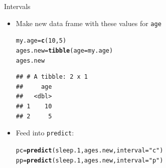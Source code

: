 \documentclass[unknownkeysallowed]{beamer}\usepackage[]{graphicx}\usepackage[]{color}
\makeatletter
\newcommand{\hlnum}[1]{\textcolor[rgb]{0.686,0.059,0.569}{#1}}%
\newcommand{\hlstr}[1]{\textcolor[rgb]{0.192,0.494,0.8}{#1}}%
\newcommand{\hlstd}[1]{\textcolor[rgb]{0.345,0.345,0.345}{#1}}%
\newcommand{\hlkwb}[1]{\textcolor[rgb]{0.69,0.353,0.396}{#1}}%
\newcommand{\hlkwc}[1]{\textcolor[rgb]{0.333,0.667,0.333}{#1}}%
\newcommand{\hlkwd}[1]{\textcolor[rgb]{0.737,0.353,0.396}{\textbf{#1}}}%
\newenvironment{kframe}{%
 \def\at@end@of@kframe{}%
 \ifinner\ifhmode%
  \def\at@end@of@kframe{\end{minipage}}%
  \begin{minipage}{\columnwidth}%
 \fi\fi%
 \def\FrameCommand##1{\hskip\@totalleftmargin \hskip-\fboxsep
 \colorbox{shadecolor}{##1}\hskip-\fboxsep
     \hskip-\linewidth \hskip-\@totalleftmargin \hskip\columnwidth}%
 \MakeFramed {\advance\hsize-\width
   \@totalleftmargin\z@ \linewidth\hsize
   \@setminipage}}%
 {\par\unskip\endMakeFramed%
 \at@end@of@kframe}
\newenvironment{knitrout}{}{} %
\makeatother
\begin{document}
\begin{frame}[fragile]{Intervals}
\begin{itemize}
\item Make new data frame with these values for \texttt{age}
  
\begin{knitrout}
\color{fgcolor}\begin{kframe}
\begin{alltt}
\hlstd{my.age}\hlkwb{=}\hlkwd{c}\hlstd{(}\hlnum{10}\hlstd{,}\hlnum{5}\hlstd{)}
\hlstd{ages.new}\hlkwb{=}\hlkwd{tibble}\hlstd{(}\hlkwc{age}\hlstd{=my.age)}
\hlstd{ages.new}
\end{alltt}
\begin{verbatim}
## # A tibble: 2 x 1
##     age
##   <dbl>
## 1    10
## 2     5
\end{verbatim}
\end{kframe}
\end{knitrout}

\item Feed into \texttt{predict}:
  
 
\begin{knitrout}
\color{fgcolor}\begin{kframe}
\begin{alltt}
\hlstd{pc}\hlkwb{=}\hlkwd{predict}\hlstd{(sleep.1,ages.new,}\hlkwc{interval}\hlstd{=}\hlstr{"c"}\hlstd{)}
\hlstd{pp}\hlkwb{=}\hlkwd{predict}\hlstd{(sleep.1,ages.new,}\hlkwc{interval}\hlstd{=}\hlstr{"p"}\hlstd{)}
\end{alltt}
\end{kframe}
\end{knitrout}

  
\end{itemize}

\end{frame}
\end{document}
